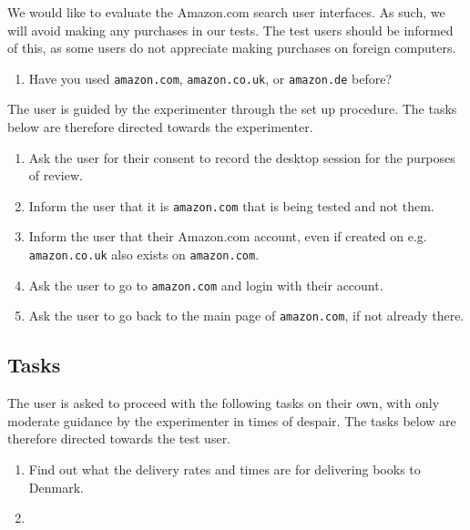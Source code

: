 
We would like to evaluate the Amazon.com search user interfaces. As such, we
will avoid making any purchases in our tests. The test users should be informed
of this, as some users do not appreciate making purchases on foreign computers.

\begin{enumerate}

\item Have you used \texttt{amazon.com}, \texttt{amazon.co.uk}, or
\texttt{amazon.de} before?

\end{enumerate}

The user is guided by the experimenter through the set up procedure. The tasks
below are therefore directed towards the experimenter.

\begin{enumerate}

\item Ask the user for their consent to record the desktop session for the
purposes of review.

\item Inform the user that it is \texttt{amazon.com} that is being tested and
not them.

\item Inform the user that their Amazon.com account, even if created on e.g.
\texttt{amazon.co.uk} also exists on \texttt{amazon.com}.

\item Ask the user to go to \texttt{amazon.com} and login with their account.

\item Ask the user to go back to the main page of \texttt{amazon.com}, if not
already there.

\end{enumerate}


\subsection{Tasks}

The user is asked to proceed with the following tasks on their own, with only
moderate guidance by the experimenter in times of despair. The tasks below are
therefore directed towards the test user.

\begin{enumerate}

\item Find out what the delivery rates and times are for delivering books to
Denmark.

\item 

\end{enumerate}
